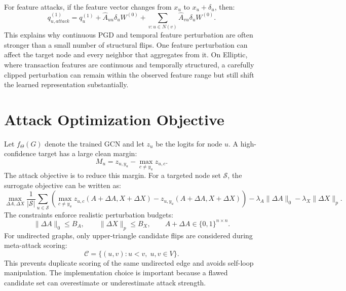 \documentclass[12pt,oneside]{report}
\begin{document}
For feature attacks, if the feature vector changes from $x_u$ to $x_u+\delta_u$, then:
$$
q_{u,attack}^{(1)}=q_u^{(1)}+\hat{A}_{uu}\delta_uW^{(0)}
+\sum_{v:u\in N(v)}\hat{A}_{vu}\delta_uW^{(0)}.
$$
This explains why continuous PGD and temporal feature perturbation are often stronger than a small number of structural flips. One feature perturbation can affect the target node and every neighbor that aggregates from it. On Elliptic, where transaction features are continuous and temporally structured, a carefully clipped perturbation can remain within the observed feature range but still shift the learned representation substantially.

\section{Attack Optimization Objective}
Let $f_{\Theta}(G)$ denote the trained GCN and let $z_u$ be the logits for node $u$. A high-confidence target has a large clean margin:
$$
M_u=z_{u,y_u}-\max_{c\neq y_u}z_{u,c}.
$$
The attack objective is to reduce this margin. For a targeted node set $\mathcal{S}$, the surrogate objective can be written as:
$$
\max_{\Delta A,\Delta X}
\frac{1}{|\mathcal{S}|}\sum_{u\in\mathcal{S}}
\left(\max_{c\neq y_u}z_{u,c}(A+\Delta A,X+\Delta X)-z_{u,y_u}(A+\Delta A,X+\Delta X)\right)
-\lambda_A\|\Delta A\|_0-\lambda_X\|\Delta X\|_p.
$$
The constraints enforce realistic perturbation budgets:
$$
\|\Delta A\|_0\leq B_A,\qquad
\|\Delta X\|_p\leq B_X,\qquad
A+\Delta A\in\{0,1\}^{n\times n}.
$$
For undirected graphs, only upper-triangle candidate flips are considered during meta-attack scoring:
$$
\mathcal{C}=\{(u,v):u<v,\;u,v\in V\}.
$$
This prevents duplicate scoring of the same undirected edge and avoids self-loop manipulation. The implementation choice is important because a flawed candidate set can overestimate or underestimate attack strength.
\end{document}
